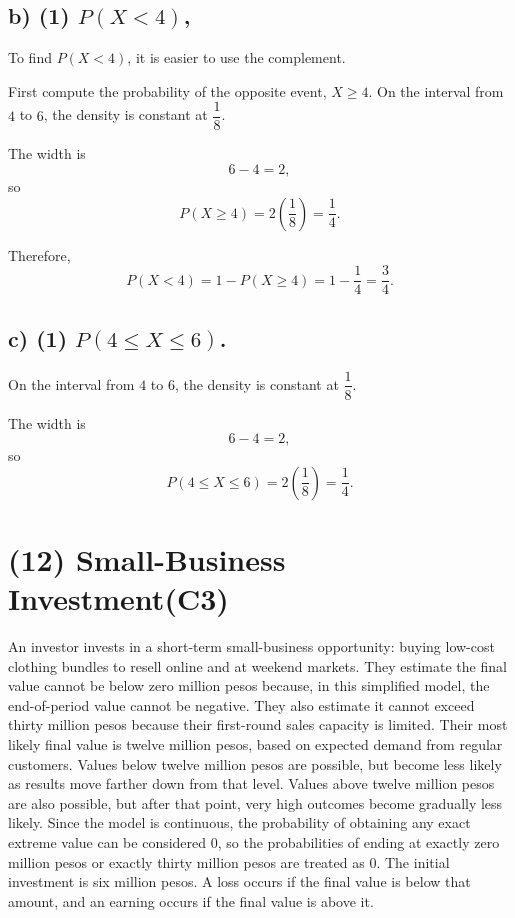 
\subsection*{b) \textbf{(1)} $P(X<4)$,}
\label{subsec:piecewise-uniform-with-unknown-k-c2-b}
To find $P(X<4)$, it is easier to use the complement.

First compute the probability of the opposite event, $X\ge 4$. On the interval from $4$ to $6$, the density is constant at $\dfrac{1}{8}$.

The width is
\[
6-4=2,
\]
so
\[
P(X\ge 4)=2\left(\frac{1}{8}\right)=\frac{1}{4}.
\]

Therefore,
\[
P(X<4)=1-P(X\ge 4)=1-\frac{1}{4}=\frac{3}{4}.
\]



\subsection*{c) \textbf{(1)} $P(4\le X\le 6)$.}
\label{subsec:piecewise-uniform-with-unknown-k-c2-c}
On the interval from $4$ to $6$, the density is constant at $\dfrac{1}{8}$.

The width is
\[
6-4=2,
\]
so
\[
P(4\le X\le 6)=2\left(\frac{1}{8}\right)=\frac{1}{4}.
\]



\section{(12) Small-Business Investment(C3)}
\label{sec:small-business-investment-c3}

An investor invests in a short-term small-business opportunity: buying low-cost clothing bundles to resell online and at weekend markets. They estimate the final value cannot be below zero million pesos because, in this simplified model, the end-of-period value cannot be negative. They also estimate it cannot exceed thirty million pesos because their first-round sales capacity is limited. Their most likely final value is twelve million pesos, based on expected demand from regular customers. Values below twelve million pesos are possible, but become less likely as results move farther down from that level. Values above twelve million pesos are also possible, but after that point, very high outcomes become gradually less likely. Since the model is continuous, the probability of obtaining any exact extreme value can be considered $0$, so the probabilities of ending at exactly zero million pesos or exactly thirty million pesos are treated as $0$. The initial investment is six million pesos. A loss occurs if the final value is below that amount, and an earning occurs if the final value is above it.

